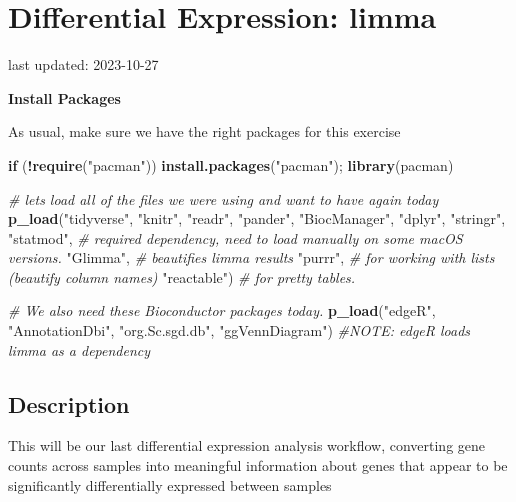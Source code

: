 \documentclass[
]{book}
\newenvironment{Shaded}{\begin{snugshade}}{\end{snugshade}}
\newcommand{\CommentTok}[1]{\textcolor[rgb]{0.56,0.35,0.01}{\textit{#1}}}
\newcommand{\ControlFlowTok}[1]{\textcolor[rgb]{0.13,0.29,0.53}{\textbf{#1}}}
\newcommand{\FunctionTok}[1]{\textcolor[rgb]{0.13,0.29,0.53}{\textbf{#1}}}
\newcommand{\NormalTok}[1]{#1}
\newcommand{\SpecialCharTok}[1]{\textcolor[rgb]{0.81,0.36,0.00}{\textbf{#1}}}
\newcommand{\StringTok}[1]{\textcolor[rgb]{0.31,0.60,0.02}{#1}}
\begin{document}
\hypertarget{differential-expression-limma}{%
\chapter{Differential Expression: limma}\label{differential-expression-limma}}

last updated: 2023-10-27

\textbf{Install Packages}

As usual, make sure we have the right packages for this exercise

\begin{Shaded}
\begin{Highlighting}[]
\ControlFlowTok{if}\NormalTok{ (}\SpecialCharTok{!}\FunctionTok{require}\NormalTok{(}\StringTok{"pacman"}\NormalTok{)) }\FunctionTok{install.packages}\NormalTok{(}\StringTok{"pacman"}\NormalTok{); }\FunctionTok{library}\NormalTok{(pacman)}

\CommentTok{\# let\textquotesingle{}s load all of the files we were using and want to have again today}
\FunctionTok{p\_load}\NormalTok{(}\StringTok{"tidyverse"}\NormalTok{, }\StringTok{"knitr"}\NormalTok{, }\StringTok{"readr"}\NormalTok{,}
       \StringTok{"pander"}\NormalTok{, }\StringTok{"BiocManager"}\NormalTok{, }
       \StringTok{"dplyr"}\NormalTok{, }\StringTok{"stringr"}\NormalTok{, }
       \StringTok{"statmod"}\NormalTok{, }\CommentTok{\# required dependency, need to load manually on some macOS versions.}
       \StringTok{"Glimma"}\NormalTok{, }\CommentTok{\# beautifies limma results}
       \StringTok{"purrr"}\NormalTok{, }\CommentTok{\# for working with lists (beautify column names)}
       \StringTok{"reactable"}\NormalTok{) }\CommentTok{\# for pretty tables.}

\CommentTok{\# We also need these Bioconductor packages today.}
\FunctionTok{p\_load}\NormalTok{(}\StringTok{"edgeR"}\NormalTok{, }\StringTok{"AnnotationDbi"}\NormalTok{, }\StringTok{"org.Sc.sgd.db"}\NormalTok{, }\StringTok{"ggVennDiagram"}\NormalTok{)}
\CommentTok{\#NOTE: edgeR loads limma as a dependency}
\end{Highlighting}
\end{Shaded}

\hypertarget{description-4}{%
\section{Description}\label{description-4}}

This will be our last differential expression analysis workflow,
converting gene counts across samples into meaningful information about
genes that appear to be significantly differentially expressed between
samples
\end{document}
